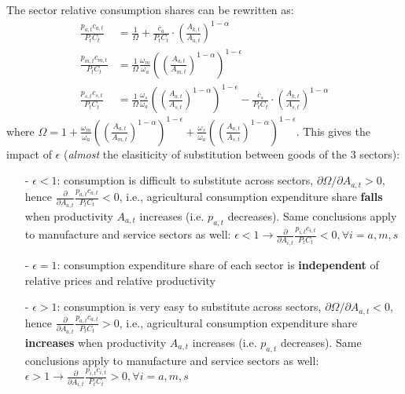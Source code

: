 \documentclass[10pt,landscape,a4paper]{article}
\let\bar\overline
\begin{document}
\begin{multicols*}{3}
The sector relative consumption shares can be rewritten as:
\begin{align*}
    \frac{p_{a,t}c_{a,t}}{P_tC_t}&=\frac{1}{\Omega}+\frac{\bar{c}_a}{P_tC_t}\cdot \left( \frac{A_{k,t}}{A_{a,t}}\right)^{1-\alpha}\\
    \frac{p_{m,t}c_{m,t}}{P_tC_t}&=\frac{1}{\Omega}\frac{\omega_m}{\omega_a} \left(\left(\frac{A_{a,t}}{A_{m,t}}\right)^{1-\alpha}\right)^{1-\epsilon}\\
    \frac{p_{s,t}c_{s,t}}{P_tC_t}&=\frac{1}{\Omega}\frac{\omega_s}{\omega_a} \left(\left(\frac{A_{a,t}}{A_{s,t}}\right)^{1-\alpha}\right)^{1-\epsilon}-\frac{\bar{c}_s}{P_tC_t}\cdot \left( \frac{A_{k,t}}{A_{s,t}}\right)^{1-\alpha}
\end{align*}
where $\Omega = 1+\frac{\omega_m}{\omega_a}\left(\left(\frac{A_{a,t}}{A_{m,t}}\right)^{1-\alpha}\right)^{1-\epsilon} + \frac{\omega_s}{\omega_a}\left(\left(\frac{A_{a,t}}{A_{s,t}}\right)^{1-\alpha}\right)^{1-\epsilon}$. This gives the impact of $\epsilon$ (\textit{almost} the elasiticity of substitution between goods of the 3 sectors):
\begin{itemize}
    \item[-] $\epsilon <1$: consumption is difficult to substitute across sectors, $\partial\Omega /\partial A_{a,t}>0$, hence $\frac{\partial}{\partial A_{a,t}}\frac{p_{a,t}c_{a,t}}{P_tC_t}<0$, i.e., agricultural consumption expenditure share \textbf{falls} when productivity $A_{a,t}$ increases (i.e. $p_{a,t}$ decreases). Same conclusions apply to manufacture and service sectors as well: $\epsilon<1 \rightarrow \frac{\partial}{\partial A_{i,t}}\frac{p_{i,t}c_{i,t}}{P_tC_t}<0,\forall i=a,m,s$
    \item[-] $\epsilon =1$: consumption expenditure share of each sector is \textbf{independent} of relative prices and relative productivity
    \item[-] $\epsilon >1$: consumption is very easy to substitute across sectors, $\partial\Omega /\partial A_{a,t}<0$, hence $\frac{\partial}{\partial A_{a,t}}\frac{p_{a,t}c_{a,t}}{P_tC_t}>0$, i.e., agricultural consumption expenditure share \textbf{increases} when productivity $A_{a,t}$ increases (i.e. $p_{a,t}$ decreases). Same conclusions apply to manufacture and service sectors as well: $\epsilon>1 \rightarrow \frac{\partial}{\partial A_{i,t}}\frac{p_{i,t}c_{i,t}}{P_tC_t}>0,\forall i=a,m,s$ 
\end{itemize}


\end{multicols*}
\end{document}
